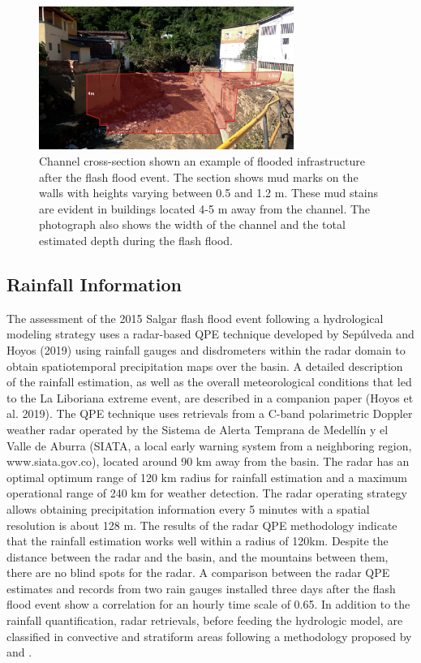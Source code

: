 \documentclass[hess, manuscript]{copernicus}
\begin{document}
\begin{figure}[t]
\centering
    \includegraphics[width=8.3cm]{Figures/Salgar_SeccionAguasAbajo.jpg}
    \caption{Channel cross-section shown an example of flooded infrastructure after the flash flood event. The section shows mud marks on the walls with heights varying between 0.5 and 1.2 m. These mud stains are evident in buildings located 4-5 m away from the channel. The photograph also shows the width of the channel and the total estimated depth during the flash flood.}
    \label{fig:Seccion}
\end{figure}

\subsection{Rainfall Information}

The assessment of the 2015 Salgar flash flood event following a hydrological modeling strategy uses a radar-based QPE technique developed by Sepúlveda and Hoyos (2019) using rainfall gauges and disdrometers within the radar domain to obtain spatiotemporal precipitation maps over the basin. A detailed description of the rainfall estimation, as well as the overall meteorological conditions that led to the La Liboriana extreme event, are described in a companion paper (Hoyos et al. 2019). The QPE technique uses retrievals from a C-band polarimetric Doppler weather radar operated by the Sistema de Alerta Temprana de Medellín y el Valle de Aburra (SIATA, a local early warning system from a neighboring region,  www.siata.gov.co), located around 90 $\text{km}$ away from the basin. The radar has an optimal optimum range of 120 $\text{km}$ radius for rainfall estimation and a maximum operational range of 240 $\text{km}$ for weather detection. The radar operating strategy allows obtaining precipitation information every 5 minutes with a spatial resolution is about 128 $\text{m}$. The results of the radar QPE methodology indicate that the rainfall estimation works well within a radius of 120km. Despite the distance between the radar and the basin, and the mountains between them, there are no blind spots for the radar. A  comparison between the radar QPE estimates and records from two rain gauges installed three days after the flash flood event show a correlation for an hourly time scale of 0.65. In addition to the rainfall quantification, radar retrievals, before feeding the hydrologic model,  are classified in convective and stratiform areas following a methodology proposed by \citet{Houze2015} and \citet{Steiner1995}.\\
\end{document}
